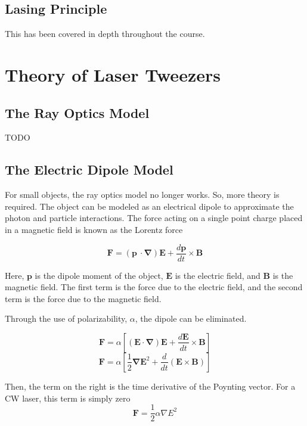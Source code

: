 \documentclass{article}
\begin{document}
\subsection*{Lasing Principle}

This has been covered in depth throughout the course. 




\section*{Theory of Laser Tweezers}


\subsection*{The Ray Optics Model}

TODO


\subsection*{The Electric Dipole Model}

For small objects, the ray optics model no longer works. So, more theory is required. The object can be modeled as an electrical dipole to approximate the photon and particle interactions. The force acting on a single point charge placed in a magnetic field is known as the Lorentz force \cite{UToronto}

\[ \mathbf{F} = (\mathbf{p}\ \cdot\mathbf{\nabla})\mathbf{E} + \frac{d\mathbf{p}}{dt}\times\mathbf{B} \]

Here, $\mathbf{p}$ is the dipole moment of the object, $\mathbf{E}$ is the electric field, and $\mathbf{B}$ is the magnetic field. The first term is the force due to the electric field, and the second term is the force due to the magnetic field.

Through the use of polarizability, $\alpha$, the dipole can be eliminated.

\[ \mathbf{F} = \alpha\left[ (\mathbf{E}\cdot\mathbf{\nabla})\mathbf{E} + \frac{d\mathbf{E}}{dt}\times\mathbf{B} \right]  \]
\[ \mathbf{F} = \alpha\left[ \frac{1}{2}\mathbf{\nabla}\mathbf{E}^2 + \frac{d}{dt}(\mathbf{E}\times\mathbf{B}) \right]  \]

Then, the term on the right is the time derivative of the Poynting vector. For a CW laser, this term is simply zero
\[ \mathbf{F} = \frac{1}{2}\alpha\nabla E^2 \]
\end{document}
